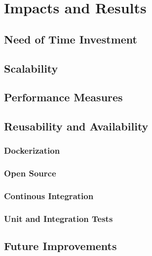 \chapter{Impacts and Results}

\section{Need of Time Investment}

\section{Scalability}

\section{Performance Measures}

\section{Reusability and Availability}

\subsection{Dockerization}

\subsection{Open Source}

\subsection{Continous Integration}

\subsection{Unit and Integration Tests}

\section{Future Improvements}